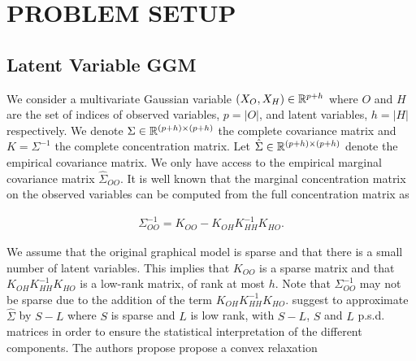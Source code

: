 \section{PROBLEM SETUP}
\label{setup}

\subsection{Latent Variable GGM}
\label{sec:ggm}
We consider a multivariate Gaussian variable $(X_{O},X_{H})\in\mathbb{R}^{p+h}$ where $O$ and $H$ are the set of indices of observed variables, $p=|O|$, and latent variables, $h=|H|$ respectively. We denote $\Sigma\in\mathbb{R}^{(p+h)\times(p+h)}$ the complete covariance matrix and $K=\Sigma^{-1}$ the complete concentration matrix. Let $\hat{\Sigma}\in\mathbb{R}^{(p+h)\times(p+h)}$ denote the empirical covariance matrix. We only have access to the empirical marginal covariance matrix $\hat{\Sigma}_{OO}$. It is well known that the marginal concentration matrix on the observed variables can be computed from the full concentration matrix as

\begin{align}
\label{schur}
\Sigma_{OO}^{-1} = K_{OO}-K_{OH}K_{HH}^{-1}K_{HO}.
\end{align}

We assume that the original graphical model is sparse and that there is a small number of latent variables. 
This implies that  $K_{OO}$ is a sparse matrix and that $K_{OH}K_{HH}^{-1}K_{HO}$ is a low-rank matrix, of rank at most $h$. Note that $\Sigma_{OO}^{-1}$ may not be sparse due to the addition of the term $K_{OH}K_{HH}^{-1}K_{HO}$.
\citet{chandrasekaran2010} suggest to approximate $\hat{\Sigma}$  by $S-L$ where $S$ is sparse and $L$ is low rank, with $S-L$, $S$ and $L$ p.s.d. matrices in order to ensure the statistical interpretation of the different components. The authors propose propose a convex relaxation 

